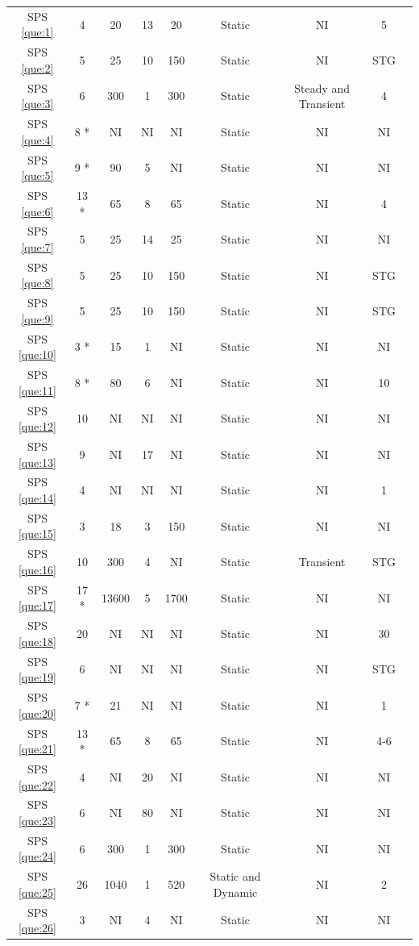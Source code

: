 \documentclass[sensors,review,accept,moreauthors,pdftex]{Definitions/mdpi}
\begin{document}
\begin{table}[H]
\begin{tabular}{ccccccccc}
		
	SPS \ref{que:1}	&	4	&	20	&	13	&	20	&	Static	&	NI	&	5	\\	
	SPS \ref{que:2}	&	5	&	25	&	10	&	150	&	Static	&	NI	&	STG	\\	
	SPS \ref{que:3}	&	6	&	300	&	1	&	300	&	Static	&	Steady and Transient	&	4	\\	
	SPS \ref{que:4}	&	8 *	&	NI	&	NI	&	NI	&	Static	&	NI	&	NI	\\	
	SPS \ref{que:5}	&	9 *	&	90	&	5	&	NI	&	Static	&	NI	&	NI	\\	
	SPS \ref{que:6}	&	13 *	&	65	&	8	&	65	&	Static	&	NI	&	4	\\	
	SPS \ref{que:7}	&	5	&	25	&	14	&	25	&	Static	&	NI	&	NI	\\	
	SPS \ref{que:8}	&	5	&	25	&	10	&	150	&	Static	&	NI	&	STG	\\	
	SPS \ref{que:9}	&	5	&	25	&	10	&	150	&	Static	&	NI	&	STG	\\	
	SPS \ref{que:10}	&	3 *	&	15	&	1	&	NI	&	Static	&	NI	&	NI	\\	
	SPS \ref{que:11}	&	8 *	&	80	&	6	&	NI	&	Static	&	NI	&	10	\\	
	SPS \ref{que:12}	&	10	&	NI	&	NI	&	NI	&	Static	&	NI	&	NI	\\	
	SPS \ref{que:13}	&	9	&	NI	&	17	&	NI	&	Static	&	NI	&	NI	\\	
	SPS \ref{que:14}	&	4	&	NI	&	NI	&	NI	&	Static	&	NI	&	1	\\	
	SPS \ref{que:15}	&	3	&	18	&	3	&	150	&	Static	&	NI	&	NI	\\	
	SPS \ref{que:16}	&	10	&	300	&	4	&	NI	&	Static	&	Transient	&	STG	\\	
	SPS \ref{que:17}	&	17 *	&	13600	&	5	&	1700	&	Static	&	NI	&	NI	\\	
	SPS \ref{que:18}	&	20	&	NI	&	NI	&	NI	&	Static	&	NI	&	30	\\	
	SPS \ref{que:19}	&	6	&	NI	&	NI	&	NI	&	Static	&	NI	&	STG	\\	
	SPS \ref{que:20}	&	7 *	&	21	&	NI	&	NI	&	Static	&	NI	&	1	\\	
	SPS \ref{que:21}	&	13 *	&	65	&	8	&	65	&	Static	&	NI	&	4-6	\\	
	SPS \ref{que:22}	&	4	&	NI	&	20	&	NI	&	Static	&	NI	&	NI	\\	
	SPS \ref{que:23}	&	6	&	NI	&	80	&	NI	&	Static	&	NI	&	NI	\\	
	SPS \ref{que:24}	&	6	&	300	&	1	&	300	&	Static	&	NI	&	NI	\\	
	SPS \ref{que:25}	&	26	&	1040	&	1	&	520	&	Static and Dynamic	&	NI	&	2	\\	
	SPS \ref{que:26}	&	3	&	NI	&	4	&	NI	&	Static	&	NI	&	NI	\\	

\end{tabular}
\end{table}
\end{document}
